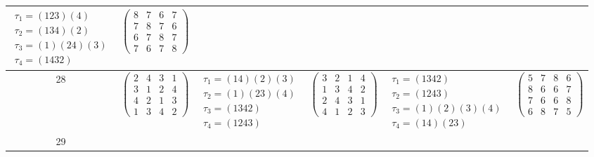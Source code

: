 \begin{longtable}{|c|p{2.7cm}|p{2.7cm}|p{2.7cm}|p{2.7cm}|p{2.7cm}|}
    $\begin{array}{l}\tau_{1}=(123)(4)\\ \tau_{2}=(134)(2)\\ \tau_{3}=(1)(24)(3)\\ \tau_{4}=(1432)\end{array}$     &
    $\begin{pmatrix} 8 & 7 & 6 & 7 \\ 7 & 8 & 7 & 6 \\ 6 & 7 & 8 & 7 \\ 7 & 6 & 7 & 8 \end{pmatrix}$                                                                                           \\
    \hline
    28                                                                                                             &
    $\begin{pmatrix} 2 & 4 & 3 & 1 \\ 3 & 1 & 2 & 4 \\ 4 & 2 & 1 & 3 \\ 1 & 3 & 4 & 2 \end{pmatrix}$               &
    $\begin{array}{l}\tau_{1}=(14)(2)(3)\\ \tau_{2}=(1)(23)(4)\\ \tau_{3}=(1342)\\ \tau_{4}=(1243)\end{array}$     &
    $\begin{pmatrix} 3 & 2 & 1 & 4 \\ 1 & 3 & 4 & 2 \\ 2 & 4 & 3 & 1 \\ 4 & 1 & 2 & 3 \end{pmatrix}$               &
    $\begin{array}{l}\tau_{1}=(1342)\\ \tau_{2}=(1243)\\ \tau_{3}=(1)(2)(3)(4)\\ \tau_{4}=(14)(23)\end{array}$     &
    $\begin{pmatrix} 5 & 7 & 8 & 6 \\ 8 & 6 & 6 & 7 \\ 7 & 6 & 6 & 8 \\ 6 & 8 & 7 & 5 \end{pmatrix}$                                                                                           \\
    \hline
    29                                                                                                             &

\end{longtable}
